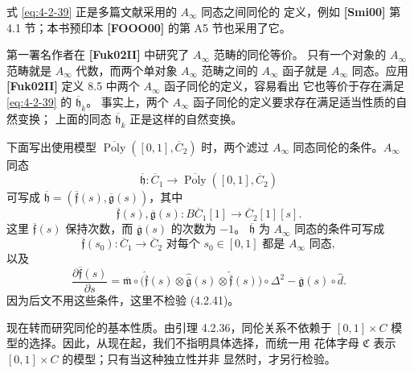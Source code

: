 式 \eqref{eq:4-2-39} 正是多篇文献采用的 $A_\infty$ 同态之间同伦的
定义，例如 \textbf{[Smi00]} 第 4.1 节；本书预印本
\textbf{[FOOO00]} 的第 A5 节也采用了它。

第一署名作者在 \textbf{[Fuk02II]} 中研究了 $A_\infty$ 范畴的同伦等价。
只有一个对象的 $A_\infty$ 范畴就是 $A_\infty$ 代数，而两个单对象
$A_\infty$ 范畴之间的 $A_\infty$ 函子就是 $A_\infty$ 同态。应用
\textbf{[Fuk02II]} 定义 8.5 中两个 $A_\infty$ 函子同伦的定义，容易看出
它也等价于存在满足 \eqref{eq:4-2-39} 的 $\overline{\mathfrak h}_k$。
事实上，两个 $A_\infty$ 函子同伦的定义要求存在满足适当性质的自然变换；
上面的同态 $\overline{\mathfrak h}_k$ 正是这样的自然变换。

下面写出使用模型
$\overline{\operatorname{Poly}}([0,1],\overline C_2)$ 时，两个滤过
$A_\infty$ 同态同伦的条件。$A_\infty$ 同态
\[
 \overline{\mathfrak h}\colon\overline C_1
 \longrightarrow\overline{\operatorname{Poly}}([0,1],\overline C_2)
\]
可写成
$\overline{\mathfrak h}=(\overline{\mathfrak f}(s),
\overline{\mathfrak g}(s))$，其中
\[
 \overline{\mathfrak f}(s),\overline{\mathfrak g}(s)
 \colon B\overline C_1[1]\longrightarrow\overline C_2[1][s].
\]
这里 $\overline{\mathfrak f}(s)$ 保持次数，而
$\overline{\mathfrak g}(s)$ 的次数为 $-1$。
$\overline{\mathfrak h}$ 为 $A_\infty$ 同态的条件可写成
\begin{equation}
 \overline{\mathfrak f}(s_0)\colon\overline C_1\longrightarrow
 \overline C_2\text{ 对每个 }s_0\in[0,1]
 \text{ 都是 }A_\infty\text{ 同态},
\tag{4.2.41.1}\label{eq:4-2-41-1}
\end{equation}
以及
{\small
\begin{equation}
 \frac{\partial\overline{\mathfrak f}(s)}{\partial s}
 =\overline{\mathfrak m}\circ
  \bigl(\widehat{\overline{\mathfrak f}}(s)
   \otimes\widehat{\overline{\mathfrak g}}(s)
   \otimes\widehat{\overline{\mathfrak f}}(s)\bigr)
  \circ\Delta^2
 -\overline{\mathfrak g}(s)\circ\widehat d.
\tag{4.2.41.2}\label{eq:4-2-41-2}
\end{equation}
}
因为后文不用这些条件，这里不检验 (4.2.41)。

现在转而研究同伦的基本性质。由引理 4.2.36，同伦关系不依赖于
$[0,1]\times C$ 模型的选择。因此，从现在起，我们不指明具体选择，而统一用
花体字母 $\mathfrak C$ 表示 $[0,1]\times C$ 的模型；只有当这种独立性并非
显然时，才另行检验。

